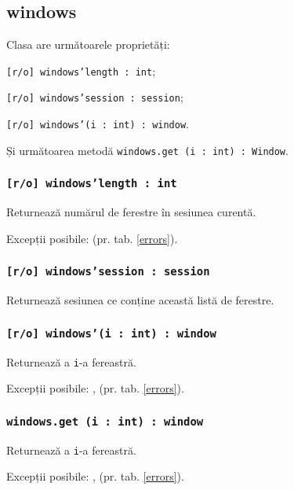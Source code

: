 \subsection{windows}

Clasa \windows{} are următoarele proprietăți:
\begin{icItems}
	\item \texttt{[r/o] windows'length : int};
	\item \texttt{[r/o] windows'session : session};
	\item \texttt{[r/o] windows'(i : int) : window}.
\end{icItems}

Și următoarea metodă \texttt{windows.get (i : int) : Window}.

\subsubsection{\texttt{[r/o] windows'length : int}}

Returnează numărul de ferestre în sesiunea curentă.

Excepții posibile:  (pr. tab. \ref{errors}).

\subsubsection{\texttt{[r/o] windows'session : session}}

Returnează sesiunea ce conține această listă de ferestre.

\subsubsection{\texttt{[r/o] windows'(i : int) : window}}

Returnează a \texttt{i}-a fereastră.

Excepții posibile: ,  (pr. tab. \ref{errors}).

\subsubsection{\texttt{windows.get (i : int) : window}}

Returnează a \texttt{i}-a fereastră.

Excepții posibile: ,  (pr. tab. \ref{errors}).


